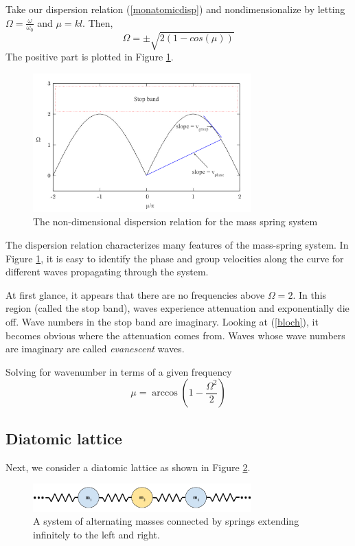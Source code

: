\documentclass{article}
\begin{document}
Take our dispersion relation (\ref{monatomicdisp}) and nondimensionalize by 
letting $\Omega=\frac{\omega}{\omega_0}$ and $\mu=kl$. Then,
\begin{equation}
\Omega = \pm \sqrt{2(1-cos(\mu))}
\end{equation}
The positive part is plotted in Figure \ref{fig:dr}.
\begin{figure}[!htbp]
	\centering
	\includegraphics[width=0.75\textwidth]{dispersion-rln.pdf}
	\caption{The non-dimensional dispersion relation for the mass spring system}
	\label{fig:dr}
\end{figure}
The dispersion relation characterizes many features of the mass-spring system. 
In Figure \ref{fig:dr}, it is easy to identify the phase and group velocities 
along the curve for different waves propagating through the system. 

At first glance, it appears that there are no frequencies above $\Omega = 2$. 
In this region (called the stop band), waves experience attenuation and 
exponentially die off. Wave numbers in the stop band are imaginary. Looking at 
(\ref{bloch}), it becomes obvious where the attenuation comes from. Waves whose 
wave numbers are imaginary are called \emph{evanescent} waves.

Solving for wavenumber in terms of a given frequency 
\begin{equation} 
\mu = \arccos{\left(1-\frac{\Omega^2}{2}\right)}
\end{equation}

\subsection{Diatomic lattice}
Next, we consider a diatomic lattice as shown in Figure \ref{fig:dms}.
\begin{figure}[!htbp]
	\centering
	\includegraphics[width=0.75\textwidth]{diatomic-mass-spring.pdf}
	\caption{A system of alternating masses connected by springs extending 
	infinitely to the left and right.}
	\label{fig:dms}
\end{figure}
\end{document}
